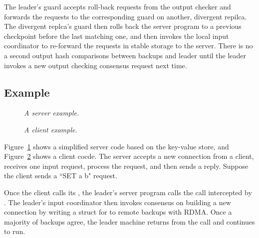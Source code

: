 The leader's guard accepts roll-back requests from the output checker and 
forwards the requests to the corresponding guard on another, divergent repilca. 
The divergent replca's guard then rolls back the server program to a previous 
checkpoint before the last matching one, and then invokes the local input 
coordinator to re-forward the requests in stable storage to the server. There 
is no a second output hash comparisons between backups and leader until the 
leader invokes a new output checking consensus request next time.


\subsection{Example}\label{sec:example}

\begin{figure}[t]
\centering
\begin{minipage}{.5\textwidth}
\end{minipage}
\vspace{-.1in}
\caption{{\em A server example.}} \label{fig:example}
\vspace{-.20in}
\end{figure}

\begin{figure}[t]
\centering
\begin{minipage}{.5\textwidth}
\end{minipage}
\vspace{-.1in}
\caption{{\em A client example.}} \label{fig:client}
\vspace{-.05in}
\end{figure}


Figure~\ref{fig:example} shows a simplified server code based on the \redis 
key-value store, and Figure~\ref{fig:client} shows a client cocde. The server 
accepts a new connection from a client, receives one input request, process the 
request, and then sends a reply. Suppose the client sends a ``SET a b" request.

Once the client calls its \connect, the leader's server program calls the 
\accept call intercepted by \xxx. The leader's input coordinator then invokes 
consensus on building a new connection by writing a struct for \accept to 
remote backups with RDMA. Once a majority of backups agree, the leader machine 
returns from the \accept call and continues to run.


